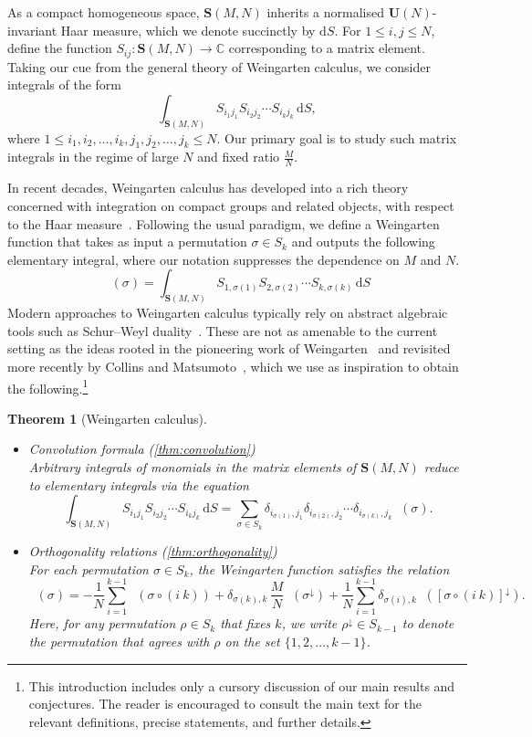 \documentclass[a4paper]{article}
\theoremstyle{plain}
\newtheorem{theoremx}{Theorem}
\numberwithin{theorem}{section}
\theoremstyle{definition}
\theoremstyle{remark}
\newcommand{\dd}{\mathrm{d}}
\renewcommand{\leq}{\leqslant}
\newcommand{\UM}{\mathbf{U}}			%
\newcommand{\SM}{\mathbf{S}}			%
\newcommand{\sm}{S}					%
\DeclareMathOperator{\SW}{Wg^{\SM}}		%
\newcommand{\SG}{S} 					%
\begin{document}
As a compact homogeneous space, $\SM(M,N)$ inherits a normalised $\UM(N)$-invariant Haar measure, which we denote succinctly by $\dd S$. For $1 \leq i, j \leq N$, define the function $S_{ij}: \SM(M,N) \to \mathbb{C}$ corresponding to a matrix element. Taking our cue from the general theory of Weingarten calculus, we consider integrals of the form
\[
\int_{\SM(M,N)} S_{i_1 j_1} S_{i_2 j_2} \cdots S_{i_k j_k} \, \dd S,
\]
where $1 \leq i_1, i_2, \ldots, i_k, j_1, j_2, \ldots, j_k \leq N$. Our primary goal is to study such matrix integrals in the regime of large $N$ and fixed ratio $\frac{M}{N}$.


In recent decades, Weingarten calculus has developed into a rich theory concerned with integration on compact groups and related objects, with respect to the Haar measure~\cite{col-mat-nov22}. Following the usual paradigm, we define a Weingarten function that takes as input a permutation $\sigma \in S_k$ and outputs the following elementary integral, where our notation suppresses the dependence on $M$ and $N$.
\[
\SW(\sigma) = \int_{\SM(M,N)} S_{1,\sigma(1)} S_{2,\sigma(2)} \cdots S_{k,\sigma(k)} \, \dd S
\]
Modern approaches to Weingarten calculus typically rely on abstract algebraic tools such as Schur--Weyl duality~\cite{col03, col-sni06}. These are not as amenable to the current setting as the ideas rooted in the pioneering work of Weingarten~\cite{wei78} and revisited more recently by Collins and Matsumoto~\cite{col-mat17}, which we use as inspiration to obtain the following.\footnote{This introduction includes only a cursory discussion of our main results and conjectures. The reader is encouraged to consult the main text for the relevant definitions, precise statements, and further details.}


\begin{theoremx}[Weingarten calculus] ~
\begin{itemize}
\item {\em Convolution formula} (\cref{thm:convolution}) \\
Arbitrary integrals of monomials in the matrix elements of $\SM(M,N)$ reduce to elementary integrals via the equation
\[
\int_{\SM(M,N)} \sm_{i_1j_1} \sm_{i_2j_2} \cdots \sm_{i_kj_k} \, \dd \sm = \sum_{\sigma \in \SG_k} \delta_{i_{\sigma(1)},j_1} \delta_{i_{\sigma(2)},j_2} \cdots \delta_{i_{\sigma(k)},j_k} \SW(\sigma).
\]

\item {\em Orthogonality relations} (\cref{thm:orthogonality}) \\
For each permutation $\sigma \in S_k$, the Weingarten function satisfies the relation
\[
\SW(\sigma) = -\frac{1}{N} \sum_{i=1}^{k-1} \SW(\sigma \circ (i~k)) + \delta_{\sigma(k),k} \, \frac{M}{N} \SW(\sigma^\downarrow) + \frac{1}{N} \sum_{i=1}^{k-1} \delta_{\sigma(i),k} \SW([\sigma \circ (i~k) ]^\downarrow).
\]
Here, for any permutation $\rho \in \SG_k$ that fixes $k$, we write $\rho^\downarrow \in \SG_{k-1}$ to denote the permutation that agrees with $\rho$ on the set $\{1, 2, \ldots, k-1\}$.
\end{itemize}
\end{theoremx}
 
\end{document}
